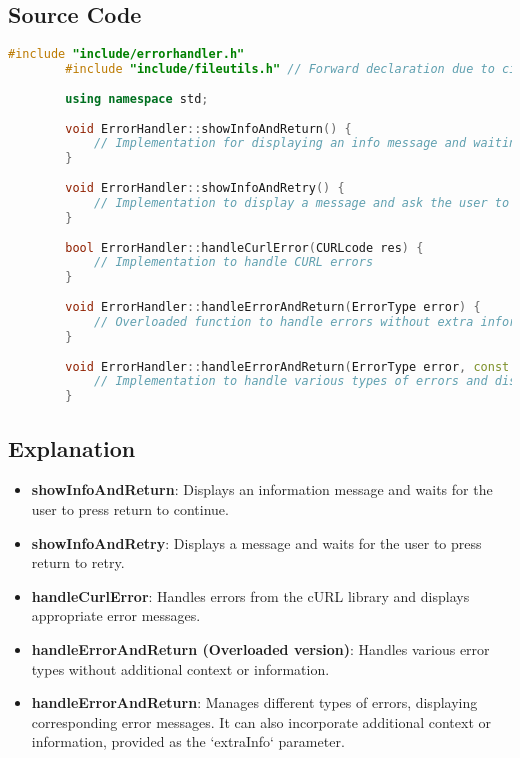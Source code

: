 \documentclass{article}
\begin{document}
	\subsection*{Source Code}
	\begin{mdframed}[backgroundcolor=background, hidealllines=false, innerleftmargin=15pt, innerrightmargin=5pt, innertopmargin=0pt, innerbottommargin=-5pt]
	\begin{lstlisting}[language=C++]
		#include "include/errorhandler.h"
		#include "include/fileutils.h" // Forward declaration due to circular dependency
		
		using namespace std;
		
		void ErrorHandler::showInfoAndReturn() {
			// Implementation for displaying an info message and waiting for user action
		}
		
		void ErrorHandler::showInfoAndRetry() {
			// Implementation to display a message and ask the user to retry
		}
		
		bool ErrorHandler::handleCurlError(CURLcode res) {
			// Implementation to handle CURL errors
		}
		
		void ErrorHandler::handleErrorAndReturn(ErrorType error) {
			// Overloaded function to handle errors without extra information
		}
		
		void ErrorHandler::handleErrorAndReturn(ErrorType error, const string& extraInfo = "") {
			// Implementation to handle various types of errors and display appropriate messages
		}
	\end{lstlisting}
\end{mdframed}
	\subsection*{Explanation}
	\begin{itemize}
		\item \textbf{showInfoAndReturn}: Displays an information message and waits for the user to press return to continue.
		\item \textbf{showInfoAndRetry}: Displays a message and waits for the user to press return to retry.
		\item \textbf{handleCurlError}: Handles errors from the cURL library and displays appropriate error messages.
		\item \textbf{handleErrorAndReturn (Overloaded version)}: Handles various error types without additional context or information.
		\item \textbf{handleErrorAndReturn}: Manages different types of errors, displaying corresponding error messages. It can also incorporate additional context or information, provided as the `extraInfo` parameter.
	\end{itemize}
	
\end{document}
